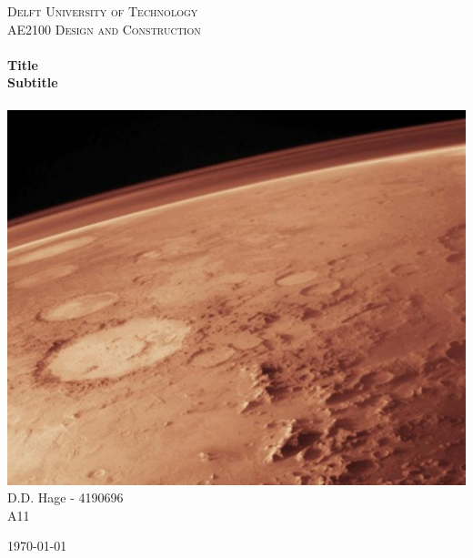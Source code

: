 \begin{titlepage}
\begin{center}

\textsc{\LARGE Delft University of Technology}\\[0.3cm]
\textsc{\Large AE2100 Design and Construction}\\[0.5cm]

\HRule \\[0.4cm]
{\Huge \bfseries Title}\\[0.2cm]
{\Large \bfseries Subtitle}\\[0.2cm]
\HRule \\[0.9cm]

\includegraphics[scale=0.35]{./Titlepage/coverpicture}\\[0.5cm]

D.D. Hage - 4190696\\[0.3cm] A11\\[0.35cm]
\vfill

\begin{large}\today \end{large}

\end{center}
\end{titlepage}